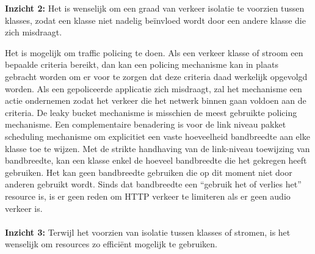 \clearpage

\noindent\textbf{Inzicht 2:} Het is wenselijk om een graad van verkeer isolatie te voorzien tussen klasses, zodat een klasse niet nadelig beïnvloed wordt door een andere klasse die zich misdraagt.

Het is mogelijk om traffic policing te doen. Als een verkeer klasse of stroom een bepaalde criteria bereikt, dan kan een policing mechanisme kan in plaats gebracht worden om er voor te zorgen dat deze criteria daad werkelijk opgevolgd worden. Als een gepoliceerde applicatie zich misdraagt, zal het mechanisme een actie ondernemen zodat het verkeer die het netwerk binnen gaan voldoen aan de criteria. De leaky bucket mechanisme is misschien de meest gebruikte policing mechanisme.
Een complementaire benadering is voor de link niveau pakket scheduling mechanisme om explicitiet een vaste hoeveelheid bandbreedte aan elke klasse toe te wijzen. Met de strikte handhaving van de link-niveau toewijzing van bandbreedte, kan een klasse enkel de hoeveel bandbreedte die het gekregen heeft gebruiken. Het kan geen bandbreedte gebruiken die op dit moment niet door anderen gebruikt wordt. Sinds dat bandbreedte een “gebruik het of verlies het” resource is, is er geen reden om HTTP verkeer te limiteren als er geen audio verkeer is.
\\\\
\textbf{Inzicht 3:} Terwijl het voorzien van isolatie tussen klasses of stromen, is het wenselijk om resources zo efficiënt mogelijk te gebruiken.

\clearpage


